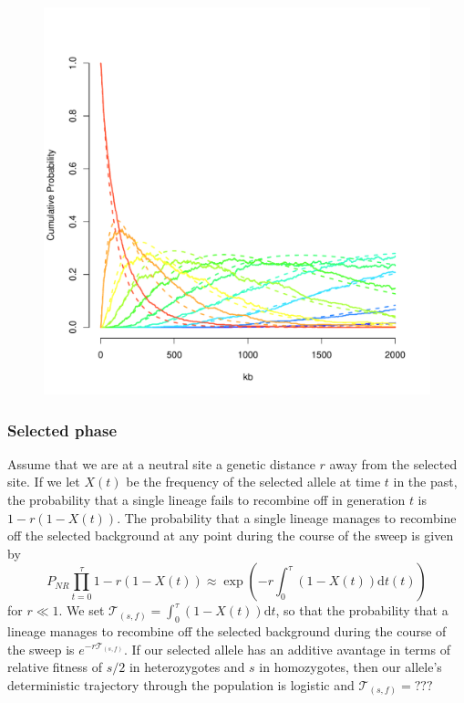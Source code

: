 \documentclass[a4paper,10pt]{article}
\begin{document}
\begin{figure}
\includegraphics[width = 0.8
          \textwidth]{Paper_Figures/Ewens_vs_Jeremy.pdf}
\end{figure}


\subsubsection{Selected phase}
Assume that we are at a neutral site a genetic distance $r$ away from the selected site. 
If we let $X\left(t\right)$ be the frequency of the selected allele at time $t$ in the past, the probability that a single lineage fails to recombine off in generation $t$ is $1-r\left(1-X(t)\right)$. The probability that a single lineage manages to recombine off the selected background at any point during the course of the sweep is given by 
\begin{equation}
P_{NR} \prod_{t=0}^{\tau} 1-r\left(1-X(t)\right)  \approx \exp \left(-r \int_0^{\tau}(1-X\left(t\right))\mathrm{d} t\left(t\right) \right)
\end{equation}
for $r \ll 1$. We set  $\mathcal{T}_{\left(s,f\right)} = \int_0^{\tau}(1-X\left(t\right))\mathrm{d}t$, so that the probability that a lineage manages to recombine off the selected background during the course of the sweep is $e^{-r\mathcal{T}_{\left(s,f\right)}}$. If our selected allele has an additive avantage in terms of relative fitness of $s/2$ in heterozygotes and $s$ in homozygotes, then our allele's deterministic trajectory through the population is logistic and $\mathcal{T}_{\left(s,f\right)} =???$
\end{document}
